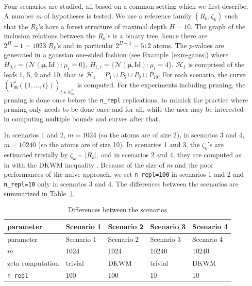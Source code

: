 \documentclass[
  11pt,
  a4paper,
]{article}
\theoremstyle{plain}
\theoremstyle{plain}
\theoremstyle{definition}
\theoremstyle{plain}
\theoremstyle{definition}
\theoremstyle{remark}
\begin{document}
Four scenarios are studied, all based on a common setting which we first
describe. A number \(m\) of hypotheses is tested. We use a reference
family \((R_k,\zeta_k)\) such that the \(R_k\)'s have a forest structure
of maximal depth \(H=10\). The graph of the inclusion relations between
the \(R_k\)'s is a binary tree, hence there are \(2^H-1=1023\) \(R_k\)'s
and in particular \(2^{H-1}=512\) atoms. The \(p\)-values are generated
in a gaussian one-sided fashion (see Example~\ref{exm-gauss}) where
\(H_{0,i}= \{ \mathcal N(\boldsymbol{\mu}, \mathrm{Id})  :\mu_i=0 \}\),
\(H_{1,i}=\{ \mathcal N(\boldsymbol{\mu}, \mathrm{Id}) :\mu_i=4 \}\).
\(\mathcal{H}_1\) is comprised of the leafs 1, 5, 9 and 10, that is
\(\mathcal{H}_1=P_1\cup P_5\cup P_9\cup P_{10}\). For each scenario, the
curve
\(\left(V^*_{\mathfrak{R}}(\{1,\dotsc,t \})\right)_{t\in\mathbb{N}_m^*}\)
is computed. For the experiments including pruning, the pruning is done
once before the \texttt{n\_repl} replications, to mimick the practice
where pruning only needs to be done once and for all, while the user may
be interested in computing multiple bounds and curves after that.

In scenarios 1 and 2, \(m=1024\) (so the atoms are of size 2), in
scenarios 3 and 4, \(m=10240\) (so the atoms are of size 10). In
scenarios 1 and 3, the \(\zeta_k\)'s are estimated trivially by
\(\zeta_k=|R_k|\), and in scenarios 2 and 4, they are computed as in
\citet{MR4178188} with the DKWM inequality \citep{MR0083864, MR1062069}.
Because of the size of \(m\) and the poor performances of the naive
approach, we set \texttt{n\_repl=100} in scenarios 1 and 2 and
\texttt{n\_repl=10} only in scenarios 3 and 4. The differences between
the scenarios are summarized in Table~\ref{tbl-scenarios}.

\begin{longtable}[]{@{}lllll@{}}
\caption{Differences between the
scenarios}\label{tbl-scenarios}\tabularnewline
\toprule\noalign{}
parameter & Scenario 1 & Scenario 2 & Scenario 3 & Scenario 4 \\
\midrule\noalign{}
\endfirsthead
\toprule\noalign{}
parameter & Scenario 1 & Scenario 2 & Scenario 3 & Scenario 4 \\
\midrule\noalign{}
\endhead
\bottomrule\noalign{}
\endlastfoot
\(m\) & 1024 & 1024 & 10240 & 10240 \\
zeta computation & trivial & DKWM & trivial & DKWM \\
\texttt{n\_repl} & 100 & 100 & 10 & 10 \\
\end{longtable}
\end{document}

